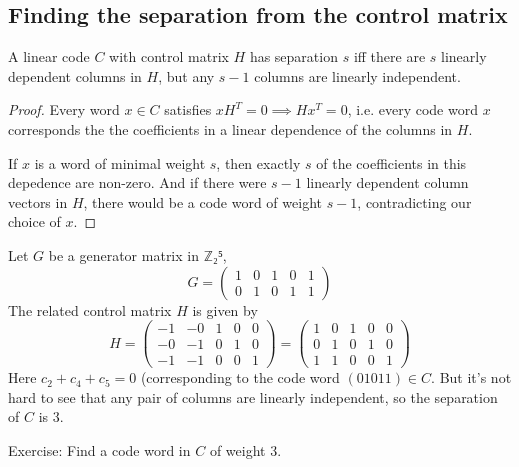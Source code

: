 \documentclass[english]{lbscript}
\begin{document}
\subsection{Finding the separation from the control matrix}
\label{sec:find-separ-from}

\begin{theorem}{}{}
  A linear code \(C\) with control matrix \(H\) has separation \(s\) iff there are \(s\) linearly dependent columns in \(H\), but any \(s-1\) columns are linearly independent.
\end{theorem}
\begin{proof}
  Every word \(x∈C\) satisfies \(xH^{T}=0⟹Hx^{T}=0\), i.e. every code word \(x\) corresponds the the coefficients in a linear dependence of the columns in \(H\).

  If \(x\) is a word of minimal weight \(s\), then exactly \(s\) of the coefficients in this depedence are non-zero. And if there were \(s-1\) linearly dependent column vectors in \(H\), there would be a code word of weight \(s-1\), contradicting our choice of \(x\).
\end{proof}
\begin{example}{}{}
  Let \(G\) be a generator matrix in \(ℤ₂⁵\),
  \begin{equation}
    \label{eq:146}
    G = \begin{pmatrix}
      1 & 0 & 1 & 0 & 1 \\
      0 & 1 & 0 & 1 & 1
    \end{pmatrix}
  \end{equation}
  The related control matrix \(H\) is given by
  \begin{equation}
    \label{eq:147}
    H = \begin{pmatrix}
      -1 & -0 & 1 & 0 & 0 \\
      -0 & -1 & 0 & 1 & 0 \\
      -1 & -1 & 0 & 0 & 1
    \end{pmatrix}
    = \begin{pmatrix}
      1 & 0 & 1 & 0 & 0 \\
      0 & 1 & 0 & 1 & 0 \\
      1 & 1 & 0 & 0 & 1
    \end{pmatrix}
  \end{equation}
  Here \(c_2+c_4+c_5=0\) (corresponding to the code word \((01011)∈C\). But it's not hard to see that any pair of columns are linearly independent, so the separation of \(C\) is \(3\).
\end{example}
\begin{example}{}{}
  Exercise: Find a code word in \(C\) of weight 3.
\end{example}
\end{document}
